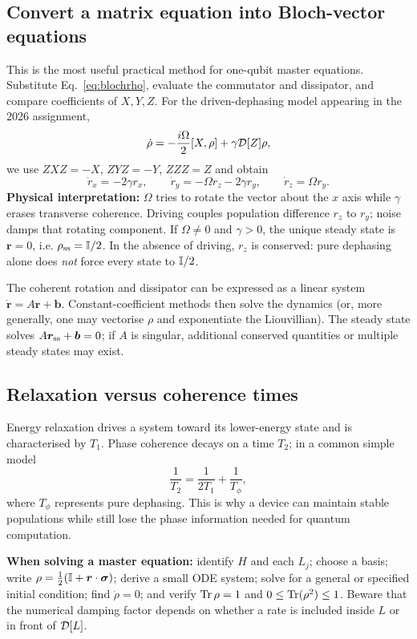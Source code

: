 \subsection{Convert a matrix equation into Bloch-vector equations}
This is the most useful practical method for one-qubit master equations. Substitute Eq.~\eqref{eq:blochrho}, evaluate the commutator and dissipator, and compare coefficients of $X,Y,Z$. For the driven-dephasing model appearing in the 2026 assignment,
\begin{equation}\label{eq:drivendephase}
\dot\rho=-\frac{i\Omega}{2}[X,\rho]+\gamma\mathcal{D}[Z]\rho,
\end{equation}
we use $ZXZ=-X$, $ZYZ=-Y$, $ZZZ=Z$ and obtain
\begin{equation}\label{eq:blochdephase}
\boxed{\dot r_x=-2\gamma r_x,\qquad
\dot r_y=-\Omega r_z-2\gamma r_y,\qquad
\dot r_z=\Omega r_y.}
\end{equation}
\textbf{Physical interpretation:} $\Omega$ tries to rotate the vector about the $x$ axis while $\gamma$ erases transverse coherence. Driving couples population difference $r_z$ to $r_y$; noise damps that rotating component. If $\Omega\ne0$ and $\gamma>0$, the unique steady state is $\bm r=0$, i.e. $\rho_{\rm ss}=\mathbb{I}/2$. In the absence of driving, $r_z$ is conserved: pure dephasing alone does \emph{not} force every state to $\mathbb{I}/2$.

The coherent rotation and dissipator can be expressed as a linear system $\dot{\bm r}=A\bm r+\bm b$. Constant-coefficient methods then solve the dynamics (or, more generally, one may vectorise $\rho$ and exponentiate the Liouvillian). The steady state solves $A\bm r_{\rm ss}+\bm b=0$; if $A$ is singular, additional conserved quantities or multiple steady states may exist.

\subsection{Relaxation versus coherence times}
Energy relaxation drives a system toward its lower-energy state and is characterised by $T_1$. Phase coherence decays on a time $T_2$; in a common simple model
\begin{equation}\label{eq:T1T2}
\frac1{T_2}=\frac1{2T_1}+\frac1{T_\phi},
\end{equation}
where $T_\phi$ represents pure dephasing. This is why a device can maintain stable populations while still lose the phase information needed for quantum computation.

\begin{examtip}
\textbf{When solving a master equation:} identify $H$ and each $L_j$; choose a basis; write $\rho=\frac12(\mathbb{I}+\bm r\cdot\bm\sigma)$; derive a small ODE system; solve for a general or specified initial condition; find $\dot\rho=0$; and verify $\operatorname{Tr}\rho=1$ and $0\leq\operatorname{Tr}(\rho^2)\leq1$. Beware that the numerical damping factor depends on whether a rate is included inside $L$ or in front of $\mathcal{D}[L]$.
\end{examtip}


